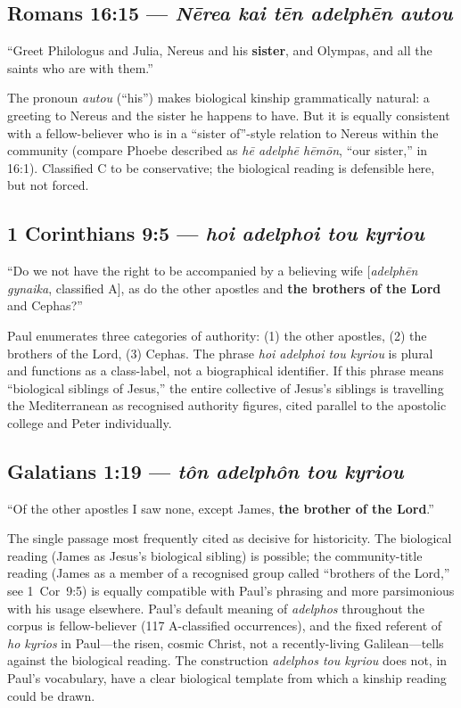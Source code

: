 \documentclass[11pt,oneside]{article}
\newcommand{\adeC}[1]{\textcolor{colorC}{\textbf{#1}}}
\begin{document}
\subsection*{Romans 16:15 --- \textit{N\=erea kai t\=en adelph\=en autou}}

\noindent\enquote{Greet Philologus and Julia, Nereus and his
\adeC{sister}, and Olympas, and all the saints who are with them.}

The pronoun \textit{autou} (``his'') makes biological kinship
grammatically natural: a greeting to Nereus and the sister he happens
to have.  But it is equally consistent with a fellow-believer who is
in a ``sister of''-style relation to Nereus within the community
(compare Phoebe described as \textit{h\=e adelph\=e h\=em\=on},
``our sister,'' in 16:1).  Classified C to be conservative; the
biological reading is defensible here, but not forced.

\subsection*{1 Corinthians 9:5 --- \textit{hoi adelphoi tou kyriou}}

\noindent\enquote{Do we not have the right to be accompanied by a
believing wife [\textit{adelph\=en gynaika}, classified A], as do the
other apostles and \adeC{the brothers of the Lord} and Cephas?}

Paul enumerates three categories of authority: (1) the other
apostles, (2) the brothers of the Lord, (3) Cephas.  The phrase
\textit{hoi adelphoi tou kyriou} is plural and functions as a
class-label, not a biographical identifier.  If this phrase means
``biological siblings of Jesus,'' the entire collective of Jesus's
siblings is travelling the Mediterranean as recognised authority
figures, cited parallel to the apostolic college and Peter
individually.

\subsection*{Galatians 1:19 --- \textit{t\^on adelph\^on tou kyriou}}

\noindent\enquote{Of the other apostles I saw none, except James,
\adeC{the brother of the Lord}.}

The single passage most frequently cited as decisive for historicity.
The biological reading (James as Jesus's biological sibling) is
possible; the community-title reading (James as a member of a
recognised group called ``brothers of the Lord,'' see 1~Cor~9:5) is
equally compatible with Paul's phrasing and more parsimonious with
his usage elsewhere.  Paul's default meaning of \textit{adelphos}
throughout the corpus is fellow-believer (117 A-classified
occurrences), and the fixed referent of \textit{ho kyrios} in
Paul---the risen, cosmic Christ, not a recently-living
Galilean---tells against the biological reading.  The construction
\textit{adelphos tou kyriou} does not, in Paul's vocabulary, have a
clear biological template from which a kinship reading could be
drawn.
\end{document}
